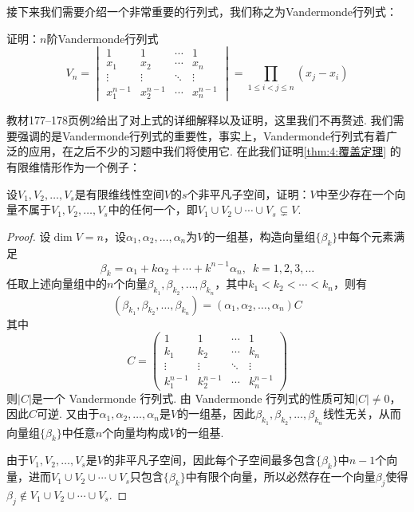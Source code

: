 接下来我们需要介绍一个非常重要的行列式，我们称之为Vandermonde行列式：
\begin{example}
    证明：$n$阶Vandermonde行列式
    \[V_n=\begin{vmatrix}
            1         & 1         & \cdots & 1         \\
            x_1       & x_2       & \cdots & x_n       \\
            \vdots    & \vdots    & \ddots & \vdots    \\
            x_1^{n-1} & x_2^{n-1} & \cdots & x_n^{n-1}
        \end{vmatrix}=\prod_{1 \leqslant i < j \leqslant n}(x_j-x_i)\]
\end{example}

教材177--178页例2给出了对上式的详细解释以及证明，这里我们不再赘述. 我们需要强调的是Vandermonde行列式的重要性，事实上，Vandermonde行列式有着广泛的应用，在之后不少的习题中我们将使用它. 在此我们证明\autoref{thm:4:覆盖定理} 的有限维情形作为一个例子：
\begin{example}\label{ex:13:行列式证明覆盖定理}
    设$V_1,V_2,\ldots,V_s$是有限维线性空间$V$的$s$个非平凡子空间，证明：$V$中至少存在一个向量不属于$V_1,V_2,\ldots,V_s$中的任何一个，即$V_1 \cup V_2 \cup \cdots \cup V_s\subsetneq V.$
\end{example}

\begin{proof}
    设$\dim V=n$，设$\alpha_1,\alpha_2,\ldots,\alpha_n$为$V$的一组基，构造向量组$\{\beta_k\}$中每个元素满足
    \[\beta_k=\alpha_1+k\alpha_2+\cdots+k^{n-1}\alpha_n,\enspace k=1,2,3,\ldots\]
    任取上述向量组中的$n$个向量$\beta_{k_1},\beta_{k_2},\ldots,\beta_{k_n}$，其中$k_1<k_2<\cdots<k_n$，则有
    \[(\beta_{k_1},\beta_{k_2},\ldots,\beta_{k_n})=(\alpha_1,\alpha_2,\ldots,\alpha_n)C\]
    其中
    \[C=\begin{pmatrix}
            1         & 1         & \cdots & 1         \\
            k_1       & k_2       & \cdots & k_n       \\
            \vdots    & \vdots    & \ddots & \vdots    \\
            k_1^{n-1} & k_2^{n-1} & \cdots & k_n^{n-1}
        \end{pmatrix}\]
    则$|C|$是一个 Vandermonde 行列式. 由 Vandermonde 行列式的性质可知$|C| \neq 0$，因此$C$可逆. 又由于$\alpha_1,\alpha_2,\ldots,\alpha_n$是$V$的一组基，因此$\beta_{k_1},\beta_{k_2},\ldots,\beta_{k_n}$线性无关，从而向量组$\{\beta_k\}$中任意$n$个向量均构成$V$的一组基.

    由于$V_1,V_2,\ldots,V_s$是$V$的非平凡子空间，因此每个子空间最多包含$\{\beta_k\}$中$n-1$个向量，进而$V_1\cup V_2\cup\cdots\cup V_s$只包含$\{\beta_k\}$中有限个向量，所以必然存在一个向量$\beta_j$使得$\beta_j \notin V_1\cup V_2\cup\cdots\cup V_s$.
\end{proof}

